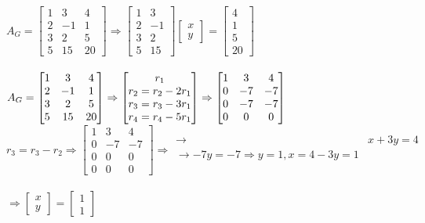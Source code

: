 \documentclass [12pt]{article}
\begin{document}
$A_G=\begin{bmatrix}
1&3&4\\
2&-1&1\\
3&2&5\\
5&15&20
\end{bmatrix} \Rightarrow \begin{bmatrix}
1&3\\
2&-1\\
3&2\\
5&15
\end{bmatrix}\begin{bmatrix}
x\\
y
\end{bmatrix}=\begin{bmatrix}
4\\
1\\
5\\
20
\end{bmatrix}$\\\\
$A_G=\begin{bmatrix}
1&3&4\\
2&-1&1\\
3&2&5\\
5&15&20
\end{bmatrix}\Rightarrow\begin{bmatrix}
r_1\\
r_2=r_2-2r_1\\
r_3=r_3-3r_1\\
r_4=r_4-5r_1
\end{bmatrix} \Rightarrow \begin{bmatrix}
1&3&4\\
0&-7&-7\\
0&-7&-7\\
0&0&0
\end{bmatrix}\indent$\\ $r_3=r_3-r_2\Rightarrow\begin{bmatrix}
1&3&4\\
0&-7&-7\\
0&0&0\\
0&0&0
\end{bmatrix}\Rightarrow\begin{matrix}
\rightarrow&x+3y=4\\
\rightarrow-7y=-7\Rightarrow y=1, x=4-3y=1\\
\end{matrix}$ \\\\
$\Rightarrow\begin{bmatrix}
x\\
y
\end{bmatrix}=\begin{bmatrix}
1\\
1
\end{bmatrix}$\\\\
\end{document}
